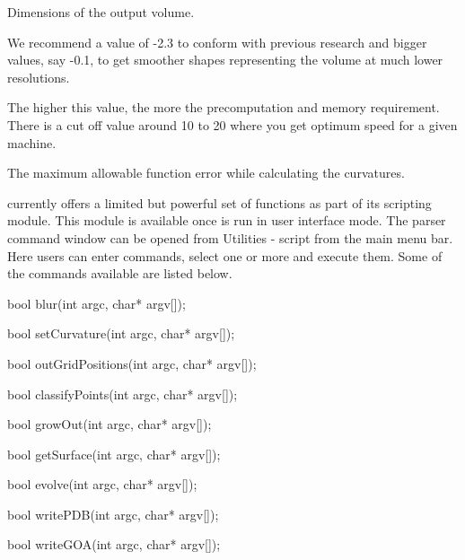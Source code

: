  Dimensions of the output volume.

 We recommend a value of -2.3 to conform
with previous research and bigger values, say -0.1, to get smoother
shapes representing the volume at much lower resolutions.

 The higher this value, the more
the precomputation and memory requirement. There is a cut off value
around 10 to 20 where you get optimum speed for a given machine.

 The maximum allowable function error
while calculating the curvatures.




\TexMol currently offers a limited but powerful set of functions as
part of its scripting module. This module is available once \TexMol
is run in user interface mode. The parser command window can be
opened from Utilities - script from the main menu bar. Here users
can enter commands, select one or more and execute them. Some of the
commands available are listed below.

\textcolor{BrickRed}{bool} blur(\textcolor{BrickRed}{int} argc,
\textcolor{BrickRed}{char*} argv[]);

\textcolor{BrickRed}{bool} setCurvature(\textcolor{BrickRed}{int}
argc, \textcolor{BrickRed}{char*} argv[]);

\textcolor{BrickRed}{bool}
outGridPositions(\textcolor{BrickRed}{int} argc,
\textcolor{BrickRed}{char*} argv[]);

\textcolor{BrickRed}{bool} classifyPoints(\textcolor{BrickRed}{int}
argc, \textcolor{BrickRed}{char*} argv[]);

\textcolor{BrickRed}{bool} growOut(\textcolor{BrickRed}{int} argc,
\textcolor{BrickRed}{char*} argv[]);

\textcolor{BrickRed}{bool} getSurface(\textcolor{BrickRed}{int}
argc, \textcolor{BrickRed}{char*} argv[]);

\textcolor{BrickRed}{bool} evolve(\textcolor{BrickRed}{int} argc,
\textcolor{BrickRed}{char*} argv[]);

\textcolor{BrickRed}{bool} writePDB(\textcolor{BrickRed}{int} argc,
\textcolor{BrickRed}{char*} argv[]);

\textcolor{BrickRed}{bool} writeGOA(\textcolor{BrickRed}{int} argc,
\textcolor{BrickRed}{char*} argv[]);

